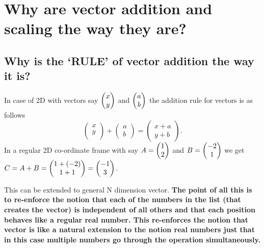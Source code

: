 \documentclass[../main.tex]{subfiles}
\begin{document}
\chapter{Why are vector addition and scaling the way they are?}

\section{Why is the `RULE'  of vector addition the way it is?}

In case of 2D with vectors say $ \blockcomment{Column-Vector: x,y} \begin{pmatrix} x \\ y \end{pmatrix} $ and $ \blockcomment{Column-Vector: a,b} \begin{pmatrix} a \\ b \end{pmatrix} $ the addition rule for vectors is as follows
\[
  \begin{pmatrix} x \\ y \\  \end{pmatrix} + \begin{pmatrix} a \\ b \end{pmatrix} = \begin{pmatrix} x+a \\ y+b \end{pmatrix}.
\]
In a regular 2D co-ordinate frame with say $ A = \blockcomment{Column-Vector: 1,2} \begin{pmatrix} 1 \\ 2 \end{pmatrix} $ and $ B = \blockcomment{Column-Vector: -2,1} \begin{pmatrix} -2 \\ 1 \end{pmatrix} $ we get $ C = A + B = \blockcomment{Column-Vector: 1+(-2),1+1} \begin{pmatrix} 1+(-2) \\ 1+1 \end{pmatrix} = \blockcomment{Column-Vector: -1,3} \begin{pmatrix} -1 \\ 3 \end{pmatrix} $.

This can be extended to general N dimension vector.
\textbf{The point of all this is to re-enforce the notion that each of the numbers in the list (that creates the vector) is independent of all others and that each position behaves like a regular real number. This re-enforces the notion that vector is like a natural extension to the notion real numbers just that in this case multiple numbers go through the operation simultaneously.}
\end{document}
